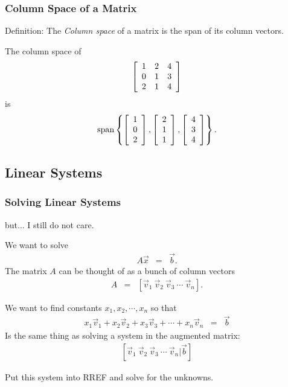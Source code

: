 \begin{frame}
  \frametitle{Column Space of a Matrix}

  {\color{red}Definition:} 
  {\color{brown}The \textit{Column space} of a matrix is the span of its
  column vectors.}

  {
    The column space of 
    \begin{eqnarray*}
      \left[ \begin{array}{rrr} 1 & 2 & 4 \\ 0 & 1 & 3 \\ 2 & 1 & 4 \end{array} \right]
    \end{eqnarray*}
    is 
    \begin{eqnarray*}
      \mathrm{span}\left\{
        \left[ \begin{array}{r} 1 \\ 0 \\ 2 \end{array} \right],\left[ \begin{array}{r} 2 \\ 1 \\ 1 \end{array} \right],\left[ \begin{array}{r} 4 \\ 3 \\ 4 \end{array} \right]\right\}.
    \end{eqnarray*}
  }

\end{frame}

\subsection{Linear Systems}

\begin{frame}
  \frametitle{Solving Linear Systems}

  but... I still do not care.

  We want to solve
  \begin{eqnarray*}
    A \vec{x} & = & \vec{b}.
  \end{eqnarray*}
  The matrix $A$ can be thought of as a bunch of column vectors
  \begin{eqnarray*}
    A & = & \left[ \vec{v}_1~\vec{v}_2~\vec{v}_3~\cdots~\vec{v}_n \right].
  \end{eqnarray*}

  We want to find constants $x_1, x_2, \cdots, x_n$ so that
  \begin{eqnarray*}
    x_1 \vec{v}_1 + x_2 \vec{v}_2 + x_3 \vec{v}_3 + \cdots + x_n \vec{v}_n & = & \vec{b}
  \end{eqnarray*}
   Is the same thing as solving a system in the augmented matrix:
  \begin{eqnarray*}
    \left[ \vec{v}_1 ~ \vec{v}_2 ~ \vec{v}_3 ~ \cdots ~ \vec{v}_n \bigg| \vec{b} \right]
  \end{eqnarray*}

  Put this system into RREF and solve for the unknowns.


\end{frame}



